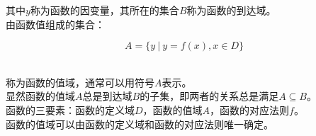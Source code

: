 \documentclass[UTF8]{ctexart}
\begin{document}
    其中$y$称为函数的因变量，其所在的集合$B$称为函数的到达域。\\[3mm]
    由函数值组成的集合：
    \begin{large}
        \begin{equation*}
            A=\big\{y~|~y=f(x),x\in D\big\}
        \end{equation*}
    \end{large}\\
    称为函数的值域，通常可以用符号$A$表示。\\[3mm]
    显然函数的值域$A$总是到达域$B$的子集，即两者的关系总是满足$A\subseteq B$。\\[8mm]
    函数的三要素：函数的定义域$D$，函数的值域$A$，函数的对应法则$f$。\\[3mm]
    函数的值域可以由函数的定义域和函数的对应法则唯一确定。

\newpage
\end{document}
